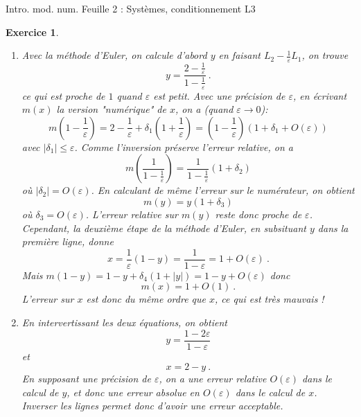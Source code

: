 \documentclass[10pt,a4paper]{article}
\def\eps{\varepsilon}
\newcommand{\abs}[1]{{\left|{#1}\right|}}
\newtheorem{exer}{Exercice}
\def\bexer{\begin{exer}\begin{em}}\def\eexer{\end{em}\end{exer}}
\begin{document}
\noindent Intro. mod. num. \hfill Feuille 2 : Syst\`emes, conditionnement \hfill {L3 \the\year}\\

\bexer 
\begin{enumerate}
\item
Avec la méthode d'Euler, on calcule d'abord $y$ en faisant $L_2-\frac{1}{\eps}L_1$, on trouve
\[
y=\frac{2-\frac{1}{\eps}}{1-\frac{1}{\eps}}~.
\]
ce qui est proche de $1$ quand $\eps$ est petit. Avec une précision de $\eps$, en écrivant $m(x)$ la version "numérique" de $x$, on a (quand $\eps\rightarrow 0$):
\[
m\left(1-\frac{1}{\eps}\right)=2-\frac{1}{\eps}+\delta_1\left(1+\frac{1}{\eps}\right)=(1-\frac{1}{\eps})(1+\delta_1+O(\eps))
\]
avec $\abs{\delta_1}\leq \eps$. Comme l'inversion préserve l'erreur relative, on a 
\[
m\left(\frac{1}{1-\frac{1}{\eps}}\right)=\frac{1}{1-\frac{1}{\eps}}(1+\delta_2)
\]
où $\abs{\delta_2}=O(\eps)$. En calculant de même l'erreur sur le numérateur, on obtient
\[
m(y)=y(1+\delta_3)
\]
où $\delta_3=O(\eps)$. L'erreur relative sur $m(y)$ reste donc proche de $\eps$. Cependant, la deuxième étape de la méthode d'Euler, en subsituant $y$ dans la première ligne, donne
\[
x=\frac{1}{\eps}(1-y)=\frac{1}{1-\eps}=1+O(\eps)~.
\]
Mais $m(1-y)=1-y+\delta_4(1+\abs{y})=1-y+O(\eps)$ donc 
\[
m(x)=1+O(1)~.
\]
L'erreur sur $x$ est donc du même ordre que $x$, ce qui est très mauvais !
\item En intervertissant les deux équations, on obtient 
\[
y=\frac{1-2\eps}{1-\eps}
\]
et 
\[
x=2-y~.
\]
En supposant une précision de $\eps$, on a une erreur relative $O(\eps)$ dans le calcul de $y$, et donc une erreur absolue en $O(\eps)$ dans le calcul de $x$. Inverser les lignes permet donc d'avoir une erreur acceptable.
\end{enumerate}
\eexer
\end{document}
